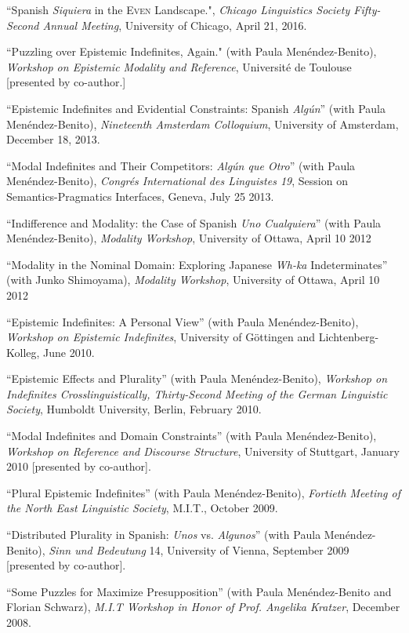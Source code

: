 \documentclass[11pt]{article}
\begin{document}
``Spanish \textit{Siquiera} in the \textsc{Even} Landscape.", \textit{Chicago Linguistics Society Fifty-Second Annual Meeting}, University of Chicago, April 21, 2016. 

``Puzzling over Epistemic Indefinites, Again." (with Paula
Men\'endez-Benito), \textit{Workshop on Epistemic Modality and Reference}, Universit\'e de Toulouse [presented by co-author.]

``Epistemic Indefinites and Evidential Constraints:
Spanish \textit{Alg\'un}''  (with Paula
Men\'endez-Benito), \textit{Nineteenth Amsterdam Colloquium}, University of Amsterdam,
December 18, 2013.

``Modal Indefinites and Their Competitors: \textit{Alg\'un
  que Otro}'' (with Paula
Men\'endez-Benito), \textit{Congr\'es International des Linguistes 19},
Session on Semantics-Pragmatics Interfaces, Geneva, July 25 2013.

``Indifference and Modality: the Case of Spanish \textit{Uno
Cualquiera}'' (with Paula
Men\'endez-Benito), \textit{Modality Workshop}, University of Ottawa, April 10 2012

``Modality in the Nominal Domain: Exploring Japanese
\textit{Wh-ka} Indeterminates'' (with Junko Shimoyama), \textit{Modality Workshop}, University of Ottawa, April 10 2012

``Epistemic Indefinites: A Personal View'' (with Paula
Men\'endez-Benito), \textit{Workshop on Epistemic Indefinites},
University of G\"{o}ttingen and Lichtenberg-Kolleg, June 2010.

``Epistemic Effects and Plurality'' (with Paula
Men\'endez-Benito), \textit{Workshop on Indefinites
  Crosslinguistically, Thirty-Second Meeting of the German Linguistic Society},
Humboldt University, Berlin, February 2010.

``Modal Indefinites and Domain Constraints'' (with Paula
Men\'endez-Benito), \textit{Workshop on Reference and Discourse
  Structure}, University of Stuttgart, January 2010 [presented by co-author].

``Plural Epistemic Indefinites'' (with Paula Men\'endez-Benito), \textit{Fortieth
  Meeting of the North East Linguistic Society}, M.I.T., October 2009.

``Distributed Plurality in Spanish: \textit{Unos} vs. \textit{Algunos}''  (with Paula Men\'endez-Benito), \textit{Sinn und Bedeutung} 14, University of Vienna, September 2009 [presented by co-author].

``Some Puzzles for Maximize Presupposition'' (with
  Paula Men\'endez-Benito and Florian Schwarz), \textit{M.I.T Workshop in
  Honor of Prof. Angelika Kratzer}, December 2008.
\end{document}
